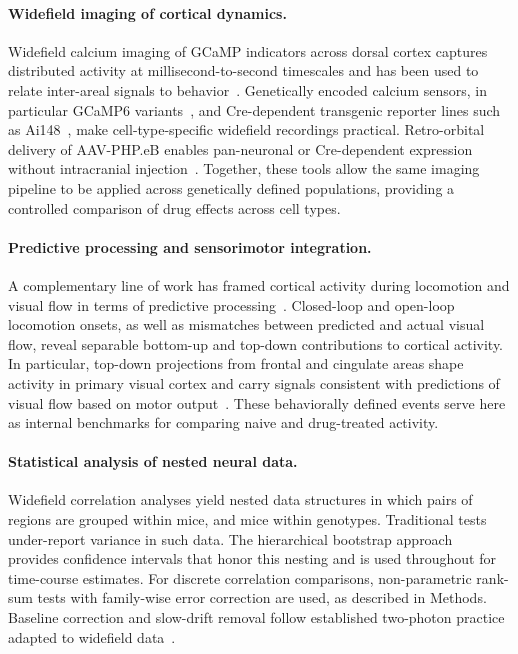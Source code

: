 \paragraph{Widefield imaging of cortical dynamics.}
Widefield calcium imaging of GCaMP indicators across dorsal cortex captures distributed activity at millisecond-to-second timescales and has been used to relate inter-areal signals to behavior~\cite{musall2019single, leinweber2017sensorimotor}. Genetically encoded calcium sensors, in particular GCaMP6 variants~\cite{chen2013ultrasensitive}, and Cre-dependent transgenic reporter lines such as Ai148~\cite{daigle2018suite, bounds2023alloptical}, make cell-type-specific widefield recordings practical. Retro-orbital delivery of AAV-PHP.eB enables pan-neuronal or Cre-dependent expression without intracranial injection~\cite{chan2017engineered}. Together, these tools allow the same imaging pipeline to be applied across genetically defined populations, providing a controlled comparison of drug effects across cell types.

\paragraph{Predictive processing and sensorimotor integration.}
A complementary line of work has framed cortical activity during locomotion and visual flow in terms of predictive processing~\cite{keller2012sensorimotor, keller2018predictive, zmarz2016mismatch, attinger2017visuomotor, leinweber2017sensorimotor}. Closed-loop and open-loop locomotion onsets, as well as mismatches between predicted and actual visual flow, reveal separable bottom-up and top-down contributions to cortical activity. In particular, top-down projections from frontal and cingulate areas shape activity in primary visual cortex and carry signals consistent with predictions of visual flow based on motor output~\cite{leinweber2017sensorimotor}. These behaviorally defined events serve here as internal benchmarks for comparing naive and drug-treated activity.

\paragraph{Statistical analysis of nested neural data.}
Widefield correlation analyses yield nested data structures in which pairs of regions are grouped within mice, and mice within genotypes. Traditional tests under-report variance in such data. The hierarchical bootstrap approach~\cite{saravanan2020hierarchical} provides confidence intervals that honor this nesting and is used throughout for time-course estimates. For discrete correlation comparisons, non-parametric rank-sum tests with family-wise error correction are used, as described in Methods. Baseline correction and slow-drift removal follow established two-photon practice adapted to widefield data~\cite{dombeck2007imaging}.


